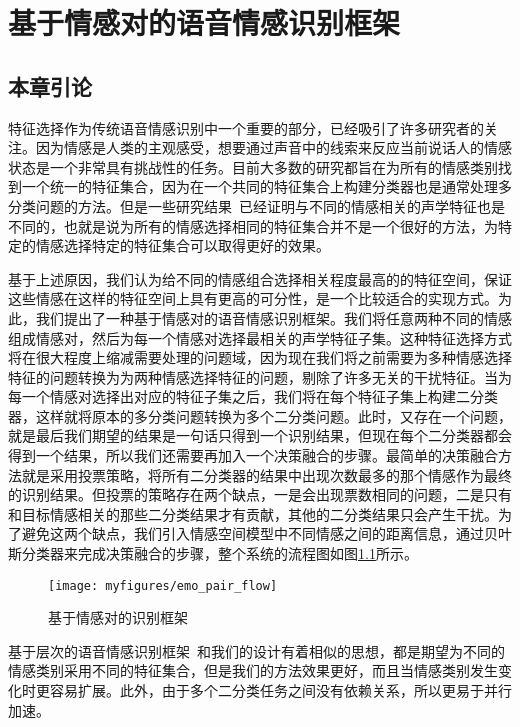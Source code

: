 \chapter{基于情感对的语音情感识别框架}
\label{cha:emo_pair_base_framework}

\section{本章引论}
\label{sec:emo_pair_base_framework_intro}
特征选择作为传统语音情感识别中一个重要的部分，已经吸引了许多研究者的关注。因为情感是人类的主观感受，想要通过声音中的线索来反应当前说话人的情感状态是一个非常具有挑战性的任务。目前大多数的研究都旨在为所有的情感类别找到一个统一的特征集合，因为在一个共同的特征集合上构建分类器也是通常处理多分类问题的方法。但是一些研究结果~\cite{Lee2009Emotion}已经证明与不同的情感相关的声学特征也是不同的，也就是说为所有的情感选择相同的特征集合并不是一个很好的方法，为特定的情感选择特定的特征集合可以取得更好的效果。

基于上述原因，我们认为给不同的情感组合选择相关程度最高的的特征空间，保证这些情感在这样的特征空间上具有更高的可分性，是一个比较适合的实现方式。为此，我们提出了一种基于情感对的语音情感识别框架。我们将任意两种不同的情感组成情感对，然后为每一个情感对选择最相关的声学特征子集。这种特征选择方式将在很大程度上缩减需要处理的问题域，因为现在我们将之前需要为多种情感选择特征的问题转换为为两种情感选择特征的问题，剔除了许多无关的干扰特征。当为每一个情感对选择出对应的特征子集之后，我们将在每个特征子集上构建二分类器，这样就将原本的多分类问题转换为多个二分类问题。此时，又存在一个问题，就是最后我们期望的结果是一句话只得到一个识别结果，但现在每个二分类器都会得到一个结果，所以我们还需要再加入一个决策融合的步骤。最简单的决策融合方法就是采用投票策略，将所有二分类器的结果中出现次数最多的那个情感作为最终的识别结果。但投票的策略存在两个缺点，一是会出现票数相同的问题，二是只有和目标情感相关的那些二分类结果才有贡献，其他的二分类结果只会产生干扰。为了避免这两个缺点，我们引入情感空间模型中不同情感之间的距离信息，通过贝叶斯分类器来完成决策融合的步骤，整个系统的流程图如图\ref{fig:emo_pair_flow}所示。

\begin{figure}[htb] %
    \centering
    \texttt{[image: myfigures/emo\_pair\_flow]}
    \caption{基于情感对的识别框架}
    \label{fig:emo_pair_flow}
\end{figure}

基于层次的语音情感识别框架~\cite{Lee2009Emotion}和我们的设计有着相似的思想，都是期望为不同的情感类别采用不同的特征集合，但是我们的方法效果更好，而且当情感类别发生变化时更容易扩展。此外，由于多个二分类任务之间没有依赖关系，所以更易于并行加速。

